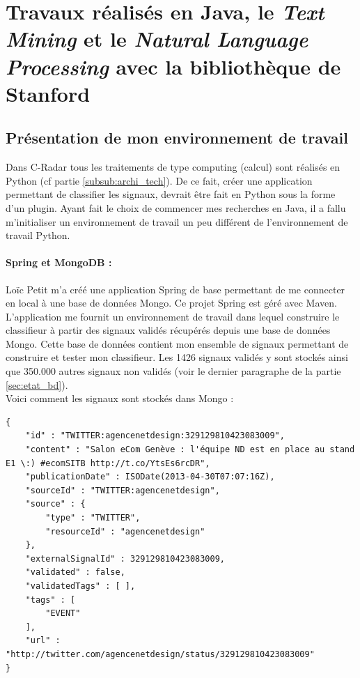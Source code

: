 \section{Travaux réalisés en Java, le \textit{Text Mining} et le \textit{Natural Language Processing} avec la bibliothèque de Stanford}
\label{sec:travaux_realises_en_java}
    \subsection{Présentation de mon environnement de travail}
        Dans C-Radar tous les traitements de type \og computing \fg (calcul) sont réalisés en Python (cf partie \ref{subsub:archi_tech}). De ce fait, créer une application permettant de classifier les signaux, devrait être fait en Python sous la forme d'un plugin. Ayant fait le choix de commencer mes recherches en Java, il a fallu m'initialiser un environnement de travail un peu différent de l'environnement de travail Python.

        \paragraph{Spring et MongoDB :}
            Loïc Petit m'a créé une application Spring de base permettant de me connecter en local à une base de données Mongo. Ce projet Spring est géré avec Maven. L'application me fournit un environnement de travail dans lequel construire le classifieur à partir des signaux validés récupérés depuis une base de données Mongo. Cette base de données contient mon ensemble de signaux permettant de construire et tester mon classifieur. Les 1426 signaux validés y sont stockés ainsi que 350.000 autres signaux non validés (voir le dernier paragraphe de la partie \ref{sec:etat_bd}).\\

        Voici comment les signaux sont stockés dans Mongo :
\begin{verbatim}
{
    "id" : "TWITTER:agencenetdesign:329129810423083009",
    "content" : "Salon eCom Genève : l'équipe ND est en place au stand E1 \:) #ecomSITB http://t.co/YtsEs6rcDR",
    "publicationDate" : ISODate(2013-04-30T07:07:16Z),
    "sourceId" : "TWITTER:agencenetdesign",
    "source" : {
        "type" : "TWITTER",
        "resourceId" : "agencenetdesign"
    },
    "externalSignalId" : 329129810423083009,
    "validated" : false,
    "validatedTags" : [ ],
    "tags" : [
        "EVENT"
    ],
    "url" : "http://twitter.com/agencenetdesign/status/329129810423083009"
}
\end{verbatim}

